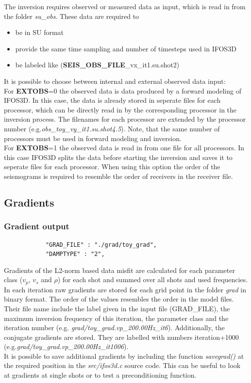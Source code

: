 The inversion requires observed or measured data as input, which is read in from the folder \textit{su\_obs}. These data are required to
\begin{itemize}
 \item be in SU format
 \item provide the same time sampling and number of timesteps used in IFOS3D
 \item be labeled like  (\textbf{SEIS\_OBS\_FILE}\_vx\_it1.su.shot2)
\end{itemize}
It is possible to choose between internal and external observed data input:\\
For \textbf{EXTOBS}=0 the observed data is data produced by a forward modeling of IFOS3D. In this case, the data is already stored in seperate files for each processor, which can be directly read in by the corresponding processor in the inversion process. The filenames for each processor are extended by the processor number (e.g.\textit{obs\_toy\_vy\_it1.su.shot4.5}). Note, that the same number of processors must be used in forward modeling and inversion. \\
For \textbf{EXTOBS}=1 the observed data is read in from one file for all processors. In this case IFOS3D splits the data before starting the inversion and saves it to seperate files for each processor. When using this option the order of the seismograms is required to resemble the order of receivers in the receiver file.
\subsection{Gradients}
\subsubsection*{Gradient output}
\begin{verbatim}
 			"GRAD_FILE" : "./grad/toy_grad",
 			"DAMPTYPE" : "2",
\end{verbatim}

Gradients of the L2-norm based data misfit are calculated for each parameter class ($v_p$, $v_s$ and $\rho$) for each shot and summed over all shots and used frequencies. In each iteration raw gradients are stored for each grid point in the folder \textit{grad} in binary format. The order of the values resembles the order in the model files. Their file name include the label given in the input file (GRAD\_FILE), the maximum inversion frequency of this iteration, the parameter class and the iteration number (e.g. \textit{grad/toy\_grad.vp\_200.00Hz\_it6}). Additionally, the conjugate gradients are stored. They are labelled with numbers iteration+1000 (e.g.\textit{grad/toy\_grad.vp\_200.00Hz\_it1006}). \\
It is possible to save additional gradients by including the function \textit{savegrad()} at the required position in the \textit{src/ifos3d.c} source code. This can be useful to look at gradients at single shots or to test a preconditioning function.
